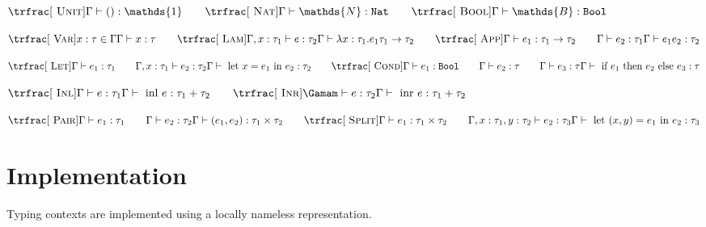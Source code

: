 \documentclass[]{acmart}
\newcommand{\nat}{\texttt{Nat}}
\newcommand{\bool}{\texttt{Bool}}
\begin{document}
  \begin{center}
    $
    \trfrac[~\textsc{Unit}]{}{\Gamma \vdash () : \mathds{1}}
      \qquad
    \trfrac[~\textsc{Nat}]{}{\Gamma \vdash \mathds{N} : \nat}
      \qquad
    \trfrac[~\textsc{Bool}]{}{\Gamma \vdash \mathds{B} : \bool}
    $\\
    \vspace*{1em}

    $\trfrac[~\textsc{Var}]{x : \tau \in \Gamma}{\Gamma \vdash x : \tau}
      \qquad
    \trfrac[~\textsc{Lam}]{\Gamma, x : \tau_1 \vdash e : \tau_2}{\Gamma \vdash \lambda x : \tau_1 . e_{1} \tau_{1} \rightarrow \tau_2}
      \qquad
    \trfrac[~\textsc{App}]{\Gamma \vdash e_1 : \tau_1 \rightarrow \tau_2 \qquad \Gamma \vdash e_{2} : \tau_1}{\Gamma \vdash e_{1} e_{2} : \tau_2}$ \\
    \vspace*{1em}

    $\trfrac[~\textsc{Let}]{\Gamma \vdash e_1 : \tau_1 \qquad \Gamma, x : \tau_1 \vdash e_2 : \tau_2}{\Gamma \vdash \text{ let } x = e_1 \text{ in } e_2 : \tau_2}
      \qquad
    \trfrac[~\textsc{Cond}]{\Gamma \vdash e_1 : \bool \qquad \Gamma \vdash e_2 : \tau \qquad \Gamma \vdash e_3 : \tau}{\Gamma \vdash \text{ if } e_1 \text{ then } e_2 \text{ else } e_3 : \tau}$ \\
    \vspace*{1em}

    $
    \trfrac[~\textsc{Inl}]{\Gamma \vdash e : \tau_1}{\Gamma \vdash \text{ inl } e : \tau_1 + \tau_2}
      \qquad
    \trfrac[~\textsc{Inr}]{\Gamam \vdash e : \tau_2}{\Gamma \vdash \text{ inr } e : \tau_1 + \tau_2}
    $\\
    \vspace*{1em}

    $\trfrac[~\textsc{Pair}]{\Gamma \vdash e_1 : \tau_1 \qquad \Gamma \vdash e_2 : \tau_2}{\Gamma \vdash (e_1, e_2) : \tau_1 \times \tau_2}
      \qquad
    \trfrac[~\textsc{Split}]{\Gamma \vdash e_1 : \tau_1 \times \tau_2 \qquad \Gamma, x : \tau_1, y : \tau_2 \vdash e_2 : \tau_3}{\Gamma \vdash \text{ let } (x, y) = e_1 \text{ in } e_2 : \tau_3}$
  \end{center}



  \section{Implementation}

  Typing contexts are implemented using a locally nameless representation.
\end{document}
